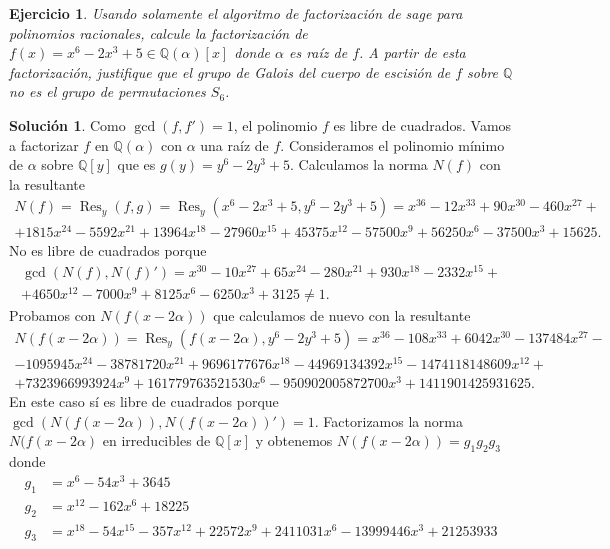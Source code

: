 \documentclass[10pt]{article}
\newtheorem{ejer}{Ejercicio}
\theoremstyle{definition}
\newtheorem*{sol}{Solución}
\newcommand{\QQ}{\mathbb{Q}}
\newcommand{\QQx}{\mathbb{Q}[x]}
\newcommand{\QQy}{\mathbb{Q}[y]}
\newcommand{\res}[1]{\operatorname{Res}_{#1}}
\begin{document}
\begin{ejer} Usando solamente el algoritmo de factorización de sage para polinomios racionales, calcule la factorización de $f(x)=x^6-2x^3+5\in\mathbb{Q}(\alpha)[x]$ donde $\alpha$ es raíz de $f$. A partir de esta factorización, justifique que el grupo de Galois del cuerpo de escisión de $f$ sobre $\mathbb{Q}$ no es el grupo de permutaciones $S_6$.
\end{ejer}
\begin{sol} Como $\gcd(f,f')=1$, el polinomio $f$ es libre de cuadrados. Vamos a factorizar $f$ en $\QQ(\alpha)$ con $\alpha$ una raíz de $f$. Consideramos el polinomio mínimo de $\alpha$ sobre $\QQy$ que es $g(y)=y^6-2y^3+5$. Calculamos la norma $N(f)$ con la resultante
\begin{multline*}
N(f)=\res{y}(f,g)=\res{y}\left(x^6-2x^3+5,y^6-2y^3+5\right)=x^{36} - 12 x^{33} + 90 x^{30} - 460 x^{27} +\\ +1815 x^{24}- 5592 x^{21} + 13964 x^{18} - 27960 x^{15} + 45375 x^{12} - 57500 x^{9} + 56250 x^{6} - 37500 x^{3} + 15625.
\end{multline*}
No es libre de cuadrados porque
\begin{multline*}
\gcd(N(f),N(f)')=x^{30} - 10 x^{27} + 65 x^{24} - 280 x^{21} + 930 x^{18}- 2332 x^{15}+\\ + 4650 x^{12} - 7000 x^{9} + 8125 x^{6} - 6250 x^{3} + 3125\neq 1.
\end{multline*}
Probamos con $N(f(x-2\alpha))$ que calculamos de nuevo con la resultante
\begin{multline*}
N(f(x-2\alpha))=\res{y}(f(x-2\alpha),y^6-2y^3+5)=x^{36} - 108 x^{33} + 6042 x^{30} - 137484 x^{27}-\\ - 1095945 x^{24}- 38781720 x^{21} + 9696177676 x^{18} - 44969134392 x^{15} - 1474118148609 x^{12}+\\ + 7323966993924 x^{9} + 161779763521530 x^{6} - 950902005872700 x^{3} + 1411901425931625.
\end{multline*}
En este caso sí es libre de cuadrados porque $\gcd(N(f(x-2\alpha)),N(f(x-2\alpha))')=1$. Factorizamos la norma $N(f(x-2\alpha)$ en irreducibles de $\QQx$ y obtenemos $N(f(x-2\alpha))=g_1g_2g_3$ donde
\[\begin{split}
g_1 & =  x^{6} - 54 x^{3} + 3645\\
g_2 & = x^{12} - 162 x^{6} + 18225\\
g_3 & = x^{18} - 54 x^{15} - 357 x^{12} + 22572 x^{9} + 2411031 x^{6} - 13999446 x^{3} + 21253933
\end{split}\]

\end{sol}
\end{document}
